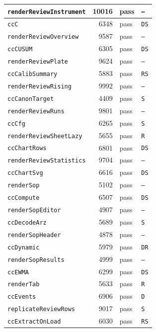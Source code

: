 {\begin{xltabular}{\linewidth}{|l|r|X|X|}
\texttt{renderReviewInstrument} & 10016 & pass & \texttt{--} \\ \hline
\texttt{ccC} & 6348 & pass & \texttt{DS} \\ \hline
\texttt{renderReviewOverview} & 9587 & pass & \texttt{--} \\ \hline
\texttt{ccCUSUM} & 6305 & pass & \texttt{DS} \\ \hline
\texttt{renderReviewPlate} & 9624 & pass & \texttt{--} \\ \hline
\texttt{ccCalibSummary} & 5883 & pass & \texttt{RS} \\ \hline
\texttt{renderReviewRising} & 9992 & pass & \texttt{--} \\ \hline
\texttt{ccCanonTarget} & 4409 & pass & \texttt{S} \\ \hline
\texttt{renderReviewRuns} & 9801 & pass & \texttt{--} \\ \hline
\texttt{ccCfg} & 6265 & pass & \texttt{S} \\ \hline
\texttt{renderReviewSheetLazy} & 5655 & pass & \texttt{R} \\ \hline
\texttt{ccChartRows} & 6801 & pass & \texttt{DS} \\ \hline
\texttt{renderReviewStatistics} & 9704 & pass & \texttt{--} \\ \hline
\texttt{ccChartSvg} & 6616 & pass & \texttt{DS} \\ \hline
\texttt{renderSop} & 5102 & pass & \texttt{--} \\ \hline
\texttt{ccCompute} & 6507 & pass & \texttt{DS} \\ \hline
\texttt{renderSopEditor} & 4907 & pass & \texttt{--} \\ \hline
\texttt{ccDecodeArz} & 5689 & pass & \texttt{S} \\ \hline
\texttt{renderSopHeader} & 4878 & pass & \texttt{--} \\ \hline
\texttt{ccDynamic} & 5979 & pass & \texttt{DR} \\ \hline
\texttt{renderSopResults} & 4999 & pass & \texttt{--} \\ \hline
\texttt{ccEWMA} & 6299 & pass & \texttt{DS} \\ \hline
\texttt{renderTab} & 5633 & pass & \texttt{R} \\ \hline
\texttt{ccEvents} & 6906 & pass & \texttt{D} \\ \hline
\texttt{replicateReviewRows} & 9017 & pass & \texttt{S} \\ \hline
\texttt{ccExtractOnLoad} & 6030 & pass & \texttt{RS} \\ \hline

\end{xltabular}}
